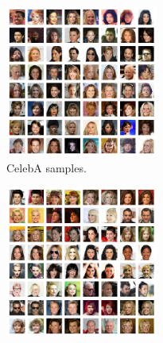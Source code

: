 \documentclass{article}
\newcommand{\figureHeight}{5cm}
\begin{document}
\begin{figure}[p]
    \centering
    \begin{subfigure}[t]{0.49\textwidth}
        \centering
        \includegraphics[height=\figureHeight]{celeba_samples.png}
        \caption{\label{fig:celeba_samples} CelebA samples.}
    \end{subfigure}
    \hfill
    \begin{subfigure}[t]{0.49\textwidth}
        \centering
        \includegraphics[height=\figureHeight]{celeba_reconstructions.png}

\end{subfigure}
\end{figure}
\end{document}
